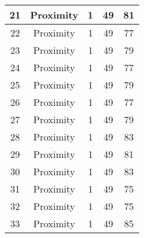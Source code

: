 \documentclass[results.tex]{subfiles}
\begin{document}
\begin{center}
\begin{tabular}{| c || c | c | c | c |}
            \hline
            21                      & Proximity                    & 1                      & 49                      & 81                   \\
            \hline
            22                      & Proximity                    & 1                      & 49                      & 77                   \\
            \hline
            23                      & Proximity                    & 1                      & 49                      & 79                   \\
            \hline
            24                      & Proximity                    & 1                      & 49                      & 77                   \\
            \hline
            25                      & Proximity                    & 1                      & 49                      & 79                   \\
            \hline
            26                      & Proximity                    & 1                      & 49                      & 77                   \\
            \hline
            27                      & Proximity                    & 1                      & 49                      & 79                   \\
            \hline
            28                      & Proximity                    & 1                      & 49                      & 83                   \\
            \hline
            29                      & Proximity                    & 1                      & 49                      & 81                   \\
            \hline
            30                      & Proximity                    & 1                      & 49                      & 83                   \\
            \hline
            31                      & Proximity                    & 1                      & 49                      & 75                   \\
            \hline
            32                      & Proximity                    & 1                      & 49                      & 75                   \\
            \hline
            33                      & Proximity                    & 1                      & 49                      & 85                   \\

\end{tabular}
\end{center}
\end{document}
